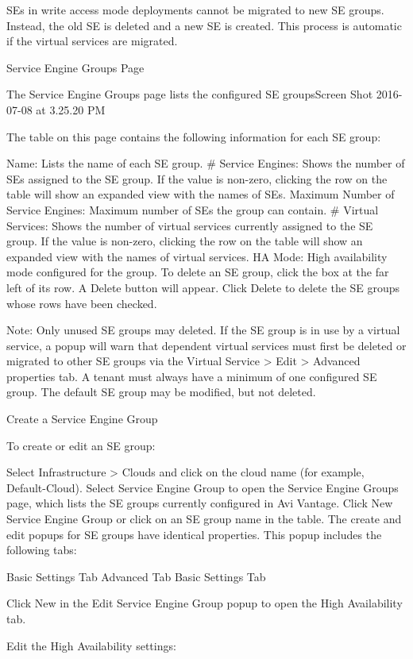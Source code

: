 \documentclass[letterpaper,10pt,english]{sphinxmanual}
\begin{document}
SEs in write access mode deployments cannot be migrated to new SE groups. Instead, the old SE is deleted and a new SE is created. This process is automatic if the virtual services are migrated.

Service Engine Groups Page

The Service Engine Groups page lists the configured SE groupsScreen Shot 2016-07-08 at 3.25.20 PM

The table on this page contains the following information for each SE group:

Name: Lists the name of each SE group.
\# Service Engines: Shows the number of SEs assigned to the SE group. If the value is non-zero, clicking the row on the table will show an expanded view with the names of SEs.
Maximum Number of Service Engines: Maximum number of SEs the group can contain.
\# Virtual Services: Shows the number of virtual services currently assigned to the SE group. If the value is non-zero, clicking the row on the table will show an expanded view with the names of virtual services.
HA Mode: High availability mode configured for the group.
To delete an SE group, click the box at the far left of its row. A Delete button will appear. Click Delete to delete the SE groups whose rows have been checked.

Note: Only unused SE groups may deleted. If the SE group is in use by a virtual service, a popup will warn that dependent virtual services must first be deleted or migrated to other SE groups via the Virtual Service \textgreater{} Edit \textgreater{} Advanced properties tab. A tenant must always have a minimum of one configured SE group. The default SE group may be modified, but not deleted.

Create a Service Engine Group

To create or edit an SE group:

Select Infrastructure \textgreater{} Clouds and click on the cloud name (for example, Default-Cloud).
Select Service Engine Group to open the Service Engine Groups page, which lists the SE groups currently configured in Avi Vantage.
Click New Service Engine Group or click on an SE group name in the table.
The create and edit popups for SE groups have identical properties. This popup includes the following tabs:

Basic Settings Tab
Advanced Tab
Basic Settings Tab

Click New in the Edit Service Engine Group popup to open the High Availability tab.

Edit the High Availability settings:
\end{document}

